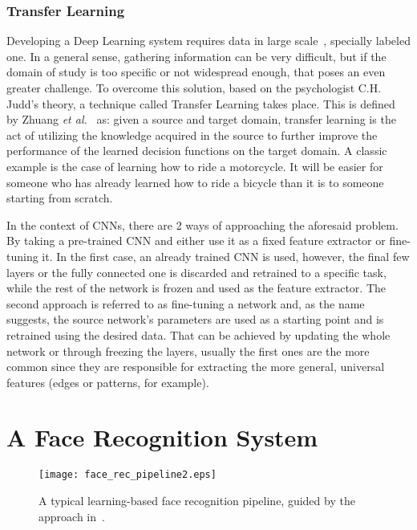 \documentclass[class=report, crop=false, a4paper, 12pt]{standalone}
\begin{document}
\subsubsection{Transfer Learning} %
\par Developing a Deep Learning system requires data in large scale~\autocite{parkhiDeepFaceRecognition2015}, specially labeled one. In a general sense, gathering information can be very difficult, but if the domain of study is too specific or not widespread enough, that poses an even greater challenge. To overcome this solution, based on the psychologist C.H. Judd's theory, a technique called Transfer Learning takes place. This is defined by Zhuang \textit{et al.}~\autocite{zhuangComprehensiveSurveyTransfer2020} as: given a source and target domain, transfer learning is the act of utilizing the knowledge acquired in the source to further improve the performance of the learned decision functions on the target domain. A classic example is the case of learning how to ride a motorcycle. It will be easier for someone who has already learned how to ride a bicycle than it is to someone starting from scratch.
\par In the context of CNNs, there are 2 ways of approaching the aforesaid problem. By taking a pre-trained CNN and either use it as a fixed feature extractor or fine-tuning it. In the first case, an already trained CNN is used, however, the final few layers or the fully connected one is discarded and retrained to a specific task, while the rest of the network is frozen and used as the feature extractor. The second approach is referred to as fine-tuning a network and, as the name suggests, the source network's parameters are used as a starting point and is retrained using the desired data. That can be achieved by updating the whole network or through freezing the layers, usually the first ones are the more common since they are responsible for extracting the more general, universal features (edges or patterns, for example).


\newpage
\section{A Face Recognition System}

\begin{figure}[H]
    \centering
    \texttt{[image: face\_rec\_pipeline2.eps]}
    \caption[A typical learning-based face recognition architecture.]{A typical learning-based face recognition pipeline, guided by the approach in~\autocite{wangDeepFaceRecognition2021}.}
    \label{fig:fr pipeline}
\end{figure}
\end{document}
